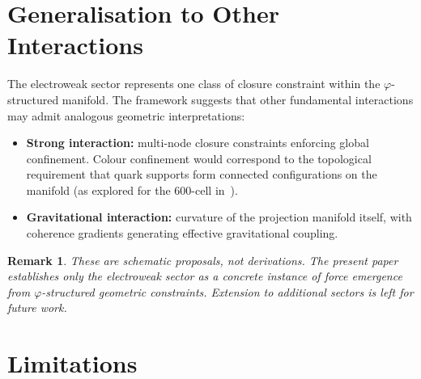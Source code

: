 \documentclass[12pt]{article}
\newtheorem{remark}[theorem]{Remark}
\newcommand{\phig}{\varphi}
\begin{document}
\section{Generalisation to Other Interactions}\label{sec:generalisation}

The electroweak sector represents one class of closure constraint within the $\phig$-structured manifold. The framework suggests that other fundamental interactions may admit analogous geometric interpretations:

\begin{itemize}
    \item \textbf{Strong interaction:} multi-node closure constraints enforcing global confinement. Colour confinement would correspond to the topological requirement that quark supports form connected configurations on the manifold (as explored for the 600-cell in~\citep{SmartV}).
    \item \textbf{Gravitational interaction:} curvature of the projection manifold itself, with coherence gradients generating effective gravitational coupling.
\end{itemize}

\begin{remark}
These are schematic proposals, not derivations. The present paper establishes only the electroweak sector as a concrete instance of force emergence from $\phig$-structured geometric constraints. Extension to additional sectors is left for future work.
\end{remark}

\section{Limitations}\label{sec:limits}
\end{document}
